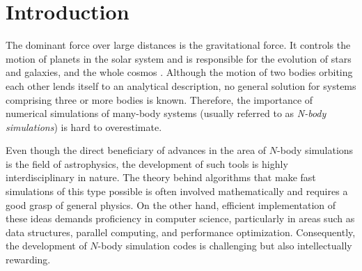 \chapter{Introduction}
The dominant force over large distances is the gravitational force.
It controls the motion of planets in the solar system and is responsible for the evolution of stars and galaxies, and the whole cosmos \cite{nordtvedt2025gravity}.
Although the motion of two bodies orbiting each other lends itself to an analytical description, no general solution for systems comprising three or more bodies is known.
Therefore, the importance of numerical simulations of many-body systems (usually referred to as \textit{N-body simulations}) is hard to overestimate.

Even though the direct beneficiary of advances in the area of $N$-body simulations is the field of astrophysics, the development of such tools is highly interdisciplinary in nature.
The theory behind algorithms that make fast simulations of this type possible is often involved mathematically and requires a good grasp of general physics.
On the other hand, efficient implementation of these ideas demands proficiency in computer science, particularly in areas such as data structures, parallel computing, and performance optimization.
Consequently, the development of $N$-body simulation codes is challenging but also intellectually rewarding.




